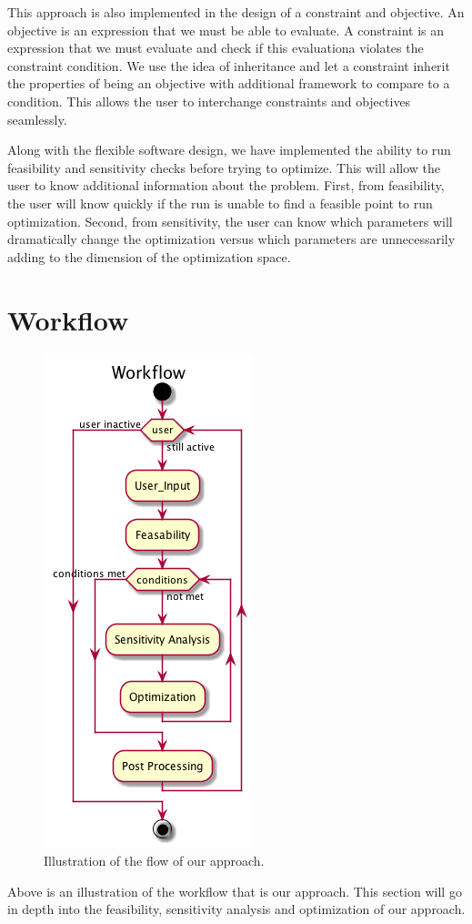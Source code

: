 \documentclass[10pt]{article}
\begin{document}
This approach is also implemented in the design of a constraint and objective. An objective is an expression that we must be able to evaluate. A constraint is an expression that we must evaluate and check if this evaluationa violates the constraint condition. We use the idea of inheritance and let a constraint inherit the properties of being an objective with additional framework to compare to a condition. This allows the user to interchange constraints and objectives seamlessly.

Along with the flexible software design, we have implemented the ability to run feasibility and sensitivity checks before trying to optimize. This will allow the user to know additional information about the problem. First, from feasibility, the user will know quickly if the run is unable to find a feasible point to run optimization. Second, from sensitivity, the user can know which parameters will dramatically change the optimization versus which parameters are unnecessarily adding to the dimension of the optimization space. 
 


\newpage
\section{Workflow}
 		\begin{figure}[h!]
		 \begin{center}\includegraphics[scale=.4]{IMSM_Workflow.png}\end{center}
		 \caption{Illustration of the flow of our approach.}
		 \label{Workflow}
		 
		 \end{figure}
Above is an illustration of the workflow that is our approach. This section will go in depth into the feasibility, sensitivity analysis and optimization of our approach.
\end{document}
